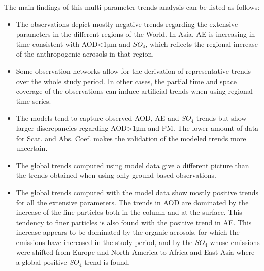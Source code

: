 \documentclass[journal abbreviation, manuscript]{copernicus}
\begin{document}
The main findings of this multi parameter trends analysis can be listed as follows:
\begin{itemize}
 \item The observations depict mostly negative trends regarding the extensive parameters in the different regions of the World. In Asia, AE is increasing in time consistent with AOD<1µm and $SO_{4}$, which reflects the regional increase of the anthropogenic aerosols in that region.
 \item Some observation networks allow for the derivation of representative trends over the whole study period. In other cases, the partial time and space coverage of the observations can induce artificial trends when using regional time series.
 \item The models tend to capture observed AOD, AE and $SO_{4}$ trends but show larger discrepancies regarding AOD>1μm and PM. The lower amount of data for Scat. and Abs. Coef. makes the validation of the modeled trends more uncertain.
 \item The global trends computed using model data give a different picture than the trends obtained when using only ground-based observations.
 \item The global trends computed with the model data show mostly positive trends for all the extensive parameters. The trends in AOD are dominated by the increase of the fine particles both in the column and at the surface. This tendency to finer particles is also found with the positive trend in AE. This increase appears to be dominated by the organic aerosols, for which the emissions have increased in the study period, and by the $SO_{4}$ whose emissions were shifted from Europe and North America to Africa and East-Asia where a global positive $SO_{4}$ trend is found.
\end{itemize}
\end{document}
